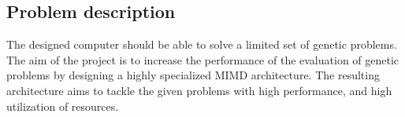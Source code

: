 \subsection{Problem description}
The designed computer should be able to solve a limited set of genetic problems.
The aim of the project is to increase the performance of the evaluation of genetic problems by designing a highly specialized MIMD architecture.
The resulting architecture aims to tackle the given problems with high performance, and high utilization of resources.


